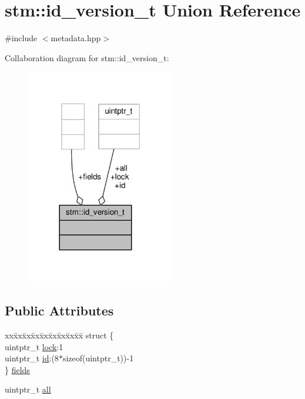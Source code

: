 \hypertarget{unionstm_1_1id__version__t}{\section{stm\-:\-:id\-\_\-version\-\_\-t Union Reference}
\label{unionstm_1_1id__version__t}
}


{\ttfamily \#include $<$metadata.\-hpp$>$}



Collaboration diagram for stm\-:\-:id\-\_\-version\-\_\-t\-:
\nopagebreak
\begin{figure}[H]
\begin{center}
\leavevmode
\includegraphics[width=182pt]{unionstm_1_1id__version__t__coll__graph}
\end{center}
\end{figure}
\subsection*{Public Attributes}
\begin{DoxyCompactItemize}
\item 
\begin{tabbing}
xx\=xx\=xx\=xx\=xx\=xx\=xx\=xx\=xx\=\kill
struct \{\\
\>uintptr\_t \hyperlink{unionstm_1_1id__version__t_a8064c40e44c8e2912c89683a31e45eed}{lock}:1\\
\>uintptr\_t \hyperlink{unionstm_1_1id__version__t_a1f425cb109ebb01b517b0b8de74ebb06}{id}:(8$\ast$sizeof(uintptr\_t))-\/1\\
\} \hyperlink{unionstm_1_1id__version__t_a76e19433e55adf1359e31402c6d966dc}{fields}\\

\end{tabbing}\item 
uintptr\-\_\-t \hyperlink{unionstm_1_1id__version__t_a10064f484ae15db0ae6943fa48a2cb9e}{all}
\end{DoxyCompactItemize}


